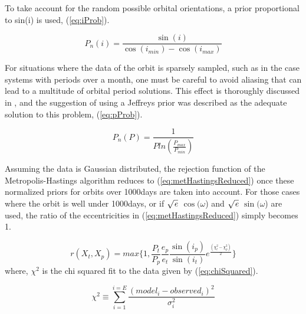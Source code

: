 \documentclass[12pt,preprint]{aastex}
\begin{document}
 
To take account for the random possible orbital orientations, a prior proportional to sin(i) is used, (\ref{eq:iProb}).

\begin{equation}\label{eq:iProb}
P_n(i) =  \frac{\sin(i)}{\cos(i_{min})-\cos(i_{max})}
\end{equation}

For situations where the data of the orbit is sparsely sampled, such as in the case systems with periods over a month, one must be careful to avoid aliasing that can lead to a multitude of orbital period solutions.  This effect is thoroughly discussed in \citet{gregory2005}, and the suggestion of using a Jeffreys prior was described as the adequate solution to this problem, (\ref{eq:pProb}).

\begin{equation}\label{eq:pProb}
P_n(P) =  \frac{1}{P ln(\frac{P_{max}}{P_{min}})}
\end{equation}

Assuming the data is Gaussian distributed, the rejection function of the Metropolis-Hastings algorithm reduces to (\ref{eq:metHastingsReduced}) once these normalized priors for orbits over 1000days are taken into account.  For those cases where the orbit is well under 1000days, or if $\sqrt{{\it e}}$ $\cos(\omega$) and $\sqrt{{\it e}}$ $\sin(\omega$) are used, the ratio of the eccentricities in (\ref{eq:metHastingsReduced}) simply becomes 1.

\begin{equation}\label{eq:metHastingsReduced}
r(X_t,X_p) = max\bigg\{1, \frac{P_t}{P_p}\frac{e_p}{e_t}\frac{\sin(i_p)}{\sin(i_t)}e^{\frac{(\chi^2_t - \chi^2_p)}{2}} \bigg\}
\end{equation}
where, $\chi^2$ is the chi squared fit to the data given by (\ref{eq:chiSquared}).

\begin{equation}\label{eq:chiSquared}
{\chi}^{2} \equiv  \sum_{i=1}^{i=E} \frac{(model_i - observed_i)^{2}}{\sigma^{2}_i}
\end{equation}



\end{document}
